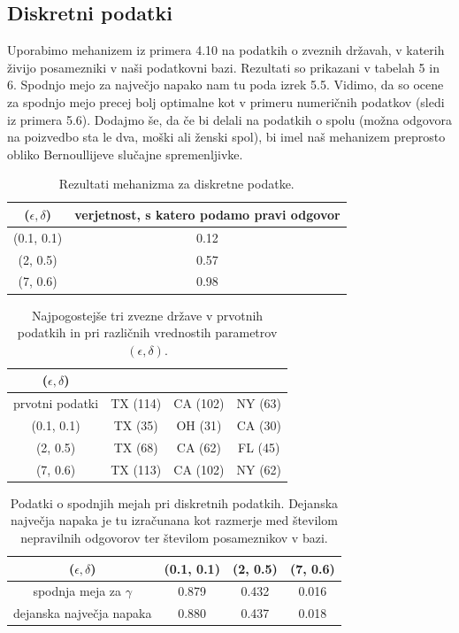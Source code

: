 \documentclass[12pt,a4paper]{amsart}
\theoremstyle{definition} %
\theoremstyle{plain} %
\begin{document}
\subsection{Diskretni podatki}
Uporabimo mehanizem iz primera 4.10 na podatkih o zveznih državah, v katerih živijo posamezniki v naši podatkovni bazi. Rezultati so prikazani v tabelah 5 in 6. Spodnjo mejo za največjo napako nam tu poda izrek 5.5. Vidimo, da so ocene za spodnjo mejo precej bolj optimalne kot v primeru numeričnih podatkov (sledi iz primera 5.6). Dodajmo še, da če bi delali na podatkih o spolu (možna odgovora na poizvedbo sta le dva, moški ali ženski spol), bi imel naš mehanizem preprosto obliko Bernoullijeve slučajne spremenljivke.
\begin{table}[!htb]
\begin{center}
 \begin{tabular}{| c | c | } 
 \hline
($\epsilon, \delta$) & verjetnost, s katero podamo pravi odgovor  \\ [0.5ex] 
 \hline
(0.1, 0.1) & 0.12  \\ 
 \hline
 (2, 0.5) & 0.57  \\ 
 \hline
 (7, 0.6) & 0.98  \\ 
 \hline
\end{tabular}
\caption{Rezultati mehanizma za diskretne podatke. }
\end{center}
\end{table}

\begin{table}[!htb]
\begin{center}
 \begin{tabular}{| c | c | c | c|} 
 \hline
($\epsilon, \delta$) & & &  \\ [0.5ex] 
 \hline
prvotni podatki & TX (114) & CA (102) & NY (63)  \\ 
 \hline
(0.1, 0.1) & TX (35) & OH (31) & CA (30)  \\ 
 \hline
(2, 0.5) & TX (68) & CA (62) & FL (45)  \\ 
 \hline
(7, 0.6) & TX (113) & CA (102) & NY (62)  \\ 
 \hline
\end{tabular}
\caption{Najpogostejše tri zvezne države v prvotnih podatkih in pri različnih vrednostih parametrov $(\epsilon, \delta)$. }
\end{center}
\end{table}

\begin{table}[!htb]
\begin{center}
 \begin{tabular}{| c | c | c | c|} 
 \hline
($\epsilon, \delta$) & (0.1, 0.1) & (2, 0.5) & (7, 0.6)  \\ [0.5ex] 
 \hline
 spodnja meja za  $\gamma$ & 0.879 & 0.432 & 0.016  \\ 
 \hline
 dejanska največja napaka & 0.880 & 0.437 & 0.018\\
 \hline
\end{tabular}
\caption{Podatki o spodnjih mejah pri diskretnih podatkih. Dejanska največja napaka je tu izračunana kot razmerje med številom nepravilnih odgovorov ter številom posameznikov v bazi. }
\end{center}
\end{table}
\end{document}
